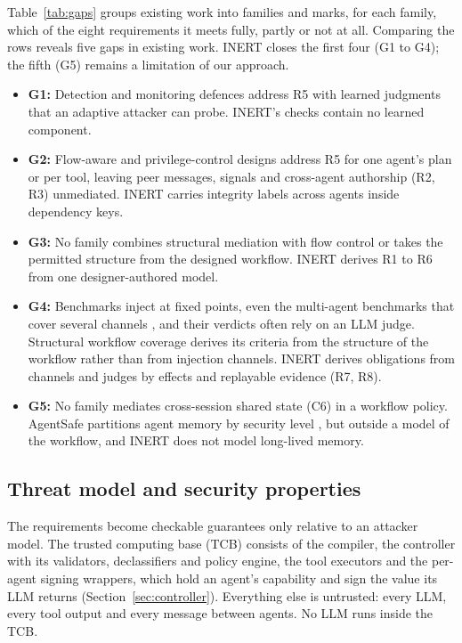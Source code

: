 \documentclass[pdflatex,sn-mathphys-num]{sn-jnl}
\theoremstyle{thmstyleone}%
\theoremstyle{thmstyletwo}%
\theoremstyle{thmstylethree}%
\begin{document}
Table~\ref{tab:gaps} groups existing work into families and marks, for each family, which of the eight requirements it meets fully, partly or not at all. Comparing the rows reveals five gaps in existing work. INERT closes the first four (G1 to G4); the fifth (G5) remains a limitation of our approach.
\begin{itemize}
\item \textbf{G1:} Detection and monitoring defences address R5 with learned judgments that an adaptive attacker can probe. INERT's checks contain no learned component.
\item \textbf{G2:} Flow-aware and privilege-control designs address R5 for one agent's plan or per tool, leaving peer messages, signals and cross-agent authorship (R2, R3) unmediated. INERT carries integrity labels across agents inside dependency keys.
\item \textbf{G3:} No family combines structural mediation with flow control or takes the permitted structure from the designed workflow. INERT derives R1 to R6 from one designer-authored model.
\item \textbf{G4:} Benchmarks inject at fixed points, even the multi-agent benchmarks that cover several channels \citep{kavathekar2025tamas,An2026ACIArenaTUH}, and their verdicts often rely on an LLM judge. Structural workflow coverage \citep{kahani2026structural} derives its criteria from the structure of the workflow rather than from injection channels. INERT derives obligations from channels and judges by effects and replayable evidence (R7, R8).
\item \textbf{G5:} No family mediates cross-session shared state (C6) in a workflow policy. AgentSafe partitions agent memory by security level \citep{Mao2025AgentSafeSLY}, but outside a model of the workflow, and INERT does not model long-lived memory.
\end{itemize}

\subsection{Threat model and security properties}\label{sec:threat}

The requirements become checkable guarantees only relative to an attacker model. The trusted computing base (TCB) consists of the compiler, the controller with its validators, declassifiers and policy engine, the tool executors and the per-agent signing wrappers, which hold an agent's capability and sign the value its LLM returns (Section~\ref{sec:controller}). Everything else is untrusted: every LLM, every tool output and every message between agents. No LLM runs inside the TCB.
\end{document}
